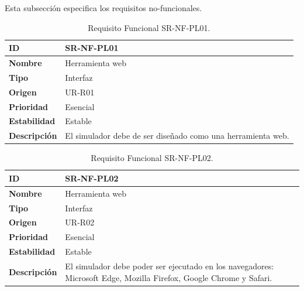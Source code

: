 Esta subsección especifica los requisitos no-funcionales.

\begin{center}
\begin{table}[htbp]
\centering
\begin{tabular}{@{}p{2.5cm} p{9cm}@{}} 
\toprule
\textbf{ID} 				& SR-NF-PL01 \\
\midrule
\textbf{Nombre} 			& Herramienta web \\
\midrule
\textbf{Tipo} 			& Interfaz \\
\midrule
\textbf{Origen} 			& UR-R01 \\
\midrule
\textbf{Prioridad}		& Esencial \\
\midrule
\textbf{Estabilidad} 		& Estable \\
\midrule
\textbf{Descripción} 	& El simulador debe de ser diseñado como una herramienta web. \\
\bottomrule
\end{tabular}
\caption{Requisito Funcional SR-NF-PL01.}
\label{tab:srnfpl01}
\end{table}
\end{center}

\begin{center}
\begin{table}[htbp]
\centering
\begin{tabular}{@{}p{2.5cm} p{9cm}@{}} 
\toprule
\textbf{ID} 				& SR-NF-PL02 \\
\midrule
\textbf{Nombre} 			& Herramienta web \\
\midrule
\textbf{Tipo} 			& Interfaz \\
\midrule
\textbf{Origen} 			& UR-R02 \\
\midrule
\textbf{Prioridad}		& Esencial \\
\midrule
\textbf{Estabilidad} 		& Estable \\
\midrule
\textbf{Descripción} 	& El simulador debe poder ser ejecutado en los navegadores: Microsoft Edge, Mozilla Firefox, Google Chrome y Safari. \\
\bottomrule
\end{tabular}
\caption{Requisito Funcional SR-NF-PL02.}
\label{tab:srnfpl02}
\end{table}
\end{center}

